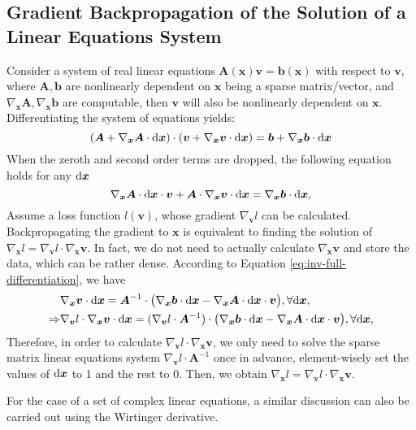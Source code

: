 \subsection{Gradient Backpropagation of the Solution of a Linear Equations System}\label{appendix:inv-linear-equation-grad}
Consider a system of real linear equations $\bm{A}(\bm{x})\bm{v}=\bm{b}(\bm{x})$ with respect to $\bm{v}$,
where $\bm{A},\bm{b}$ are nonlinearly dependent on $\bm{x}$ being a sparse matrix/vector, and
$\nabla_{\bm{x}}\bm{A},\nabla_{\bm{x}}\bm{b}$
are computable, then $\bm{v}$ will also be nonlinearly dependent on $\bm{x}$. Differentiating the system of equations yields:
\[
(\bm{A}+\nabla_{\bm{x}}\bm{A}\cdot\mathrm{d}\bm{x})\cdot
(\bm{v}+\nabla_{\bm{x}}\bm{v}\cdot\mathrm{d}\bm{x})
=\bm{b}+\nabla_{\bm{x}}\bm{b}\cdot\mathrm{d}\bm{x}
\]
When the zeroth and second order terms are dropped, the following equation holds for any $\mathrm{d}\bm{x}$
\begin{equation}\label{eq:inv-full-differentiation}
\nabla_{\bm{x}}\bm{A}\cdot\mathrm{d}\bm{x}\cdot\bm{v}
+\bm{A}\cdot\nabla_{\bm{x}}\bm{v}\cdot\mathrm{d}\bm{x}
=\nabla_{\bm{x}}\bm{b}\cdot\mathrm{d}\bm{x},
\end{equation}
Assume a loss function $l(\bm{v})$, whose gradient $\nabla_{\bm{v}}l$ can be calculated.
Backpropagating the gradient to $\bm{x}$ is equivalent to finding the solution of
$\nabla_{\bm{x}}l=\nabla_{\bm{v}}l\cdot\nabla_{\bm{x}}\bm{v}$.
In fact, we do not need to actually calculate $\nabla_{\bm{x}}\bm{v}$ and store the data, which can be rather dense.
According to Equation \ref{eq:inv-full-differentiation}, we have
\[
\begin{split}
& \nabla_{\bm{x}}\bm{v}\cdot\mathrm{d}\bm{x}
= \bm{A}^{-1}\cdot\big(\nabla_{\bm{x}}\bm{b}\cdot\mathrm{d}\bm{x}-
\nabla_{\bm{x}}\bm{A}\cdot\mathrm{d}\bm{x}\cdot\bm{v}\big),\forall \mathrm{d}\bm{x}, \\
\Rightarrow
& \nabla_{\bm{v}}l\cdot\nabla_{\bm{x}}\bm{v}\cdot\mathrm{d}\bm{x}
= (\nabla_{\bm{v}}l\cdot\bm{A}^{-1})\cdot\big(\nabla_{\bm{x}}\bm{b}\cdot\mathrm{d}\bm{x}-
\nabla_{\bm{x}}\bm{A}\cdot\mathrm{d}\bm{x}\cdot\bm{v}\big),\forall \mathrm{d}\bm{x}, \\
\end{split}
\]
Therefore, in order to calculate $\nabla_{\bm{v}}l\cdot\nabla_{\bm{x}}\bm{v}$,
we only need to solve the sparse matrix linear equations system $\nabla_{\bm{v}}l\cdot\bm{A}^{-1}$ once in advance,
element-wisely set the values of $\mathrm{d}\bm{x}$ to 1 and the rest to 0. Then, we obtain
$\nabla_{\bm{x}}l=\nabla_{\bm{v}}l\cdot\nabla_{\bm{x}}\bm{v}$.

For the case of a set of complex linear equations, a similar discussion can also be carried out using the Wirtinger derivative.
